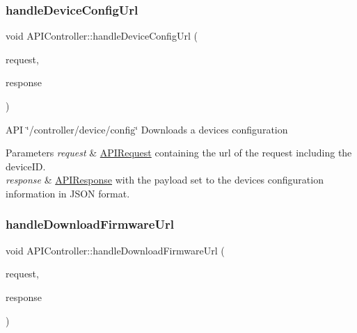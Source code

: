 \subsubsection{\texorpdfstring{handle\+Device\+Config\+Url}{handleDeviceConfigUrl}}
{\footnotesize\ttfamily void A\+P\+I\+Controller\+::handle\+Device\+Config\+Url (\begin{DoxyParamCaption}\item[{const \hyperlink{class_a_p_i_request}{A\+P\+I\+Request} \&}]{request,  }\item[{\hyperlink{class_a_p_i_response}{A\+P\+I\+Response} $\ast$}]{response }\end{DoxyParamCaption})\hspace{0.3cm}{\ttfamily [slot]}}

A\+PI \char`\"{}/controller/device/config\char`\"{} Downloads a device\textquotesingle{}s configuration 
\begin{DoxyParams}{Parameters}
{\em request} & \hyperlink{class_a_p_i_request}{A\+P\+I\+Request} containing the url of the request including the device\+ID. \\
\hline
{\em response} & \hyperlink{class_a_p_i_response}{A\+P\+I\+Response} with the payload set to the device\textquotesingle{}s configuration information in J\+S\+ON format. \\
\hline
\end{DoxyParams}
\mbox{\label{class_a_p_i_controller_afb480d438e18a2551229810280a65806}} 
\subsubsection{\texorpdfstring{handle\+Download\+Firmware\+Url}{handleDownloadFirmwareUrl}}
{\footnotesize\ttfamily void A\+P\+I\+Controller\+::handle\+Download\+Firmware\+Url (\begin{DoxyParamCaption}\item[{const \hyperlink{class_a_p_i_request}{A\+P\+I\+Request} \&}]{request,  }\item[{\hyperlink{class_a_p_i_response}{A\+P\+I\+Response} $\ast$}]{response }\end{DoxyParamCaption})\hspace{0.3cm}{\ttfamily [slot]}}

